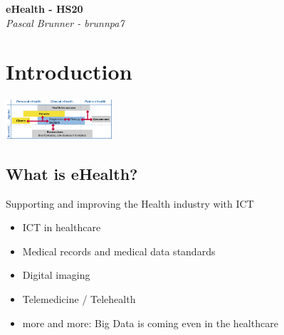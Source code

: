 \documentclass{report}
\newenvironment{Figure}
	{\par\medskip\noindent\minipage{\linewidth}}
	{\endminipage\par\medskip}
\theoremstyle{definition}
\theoremstyle{example}
\begin{document}
\begin{titlepage}
   \begin{center}
      \Large\textbf{eHealth - HS20}\\
      \large\textit{Pascal Brunner - brunnpa7}
   \end{center}
\end{titlepage}


\tableofcontents

\newpage

\chapter{Introduction}

\begin{Figure}
   \centering
    \includegraphics[width=150px]{img/domains.png}
        \label{fig:eHealth domains}
    \end{Figure}

\section{What is eHealth?}
Supporting and improving the Health industry with ICT
\begin{itemize}
   \item ICT in healthcare
   \item Medical records and medical data standards
   \item Digital imaging
   \item Telemedicine / Telehealth
   \item more and more: Big Data is coming even in the healthcare
\end{itemize}
\end{document}
